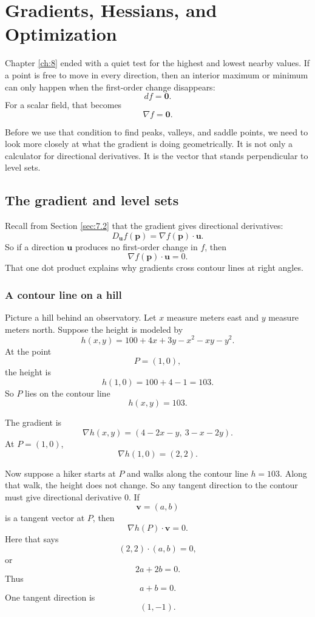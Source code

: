 
\chapter{Gradients, Hessians, and Optimization}
\label{ch:9}

Chapter \ref{ch:8} ended with a quiet test for the highest and lowest nearby values.
If a point is free to move in every direction, then an interior maximum or minimum can
only happen when the first-order change disappears:
\[
    df=\mathbf 0.
\]
For a scalar field, that becomes
\[
    \nabla f=\mathbf 0.
\]

Before we use that condition to find peaks, valleys, and saddle points, we need to look
more closely at what the gradient is doing geometrically.  It is not only a calculator for
directional derivatives.  It is the vector that stands perpendicular to level sets.

\section{The gradient and level sets}
\label{sec:9.1}

Recall from Section \ref{sec:7.2} that the gradient gives directional derivatives:
\[
    D_{\mathbf u}f(\mathbf p)=\nabla f(\mathbf p)\cdot \mathbf u.
\]
So if a direction \(\mathbf u\) produces no first-order change in \(f\), then
\[
    \nabla f(\mathbf p)\cdot \mathbf u=0.
\]
That one dot product explains why gradients cross contour lines at right angles.

\subsection{A contour line on a hill}

Picture a hill behind an observatory.  Let \(x\) measure meters east and \(y\) measure
meters north.  Suppose the height is modeled by
\[
    h(x,y)=100+4x+3y-x^2-xy-y^2.
\]
At the point
\[
    P=(1,0),
\]
the height is
\[
    h(1,0)=100+4-1=103.
\]
So \(P\) lies on the contour line
\[
    h(x,y)=103.
\]

The gradient is
\[
    \nabla h(x,y)=\left(4-2x-y,\ 3-x-2y\right).
\]
At \(P=(1,0)\),
\[
    \nabla h(1,0)=(2,2).
\]

Now suppose a hiker starts at \(P\) and walks along the contour line \(h=103\).
Along that walk, the height does not change.  So any tangent direction to the contour
must give directional derivative \(0\).  If
\[
    \mathbf v=(a,b)
\]
is a tangent vector at \(P\), then
\[
    \nabla h(P)\cdot \mathbf v=0.
\]
Here that says
\[
    (2,2)\cdot(a,b)=0,
\]
or
\[
    2a+2b=0.
\]
Thus
\[
    a+b=0.
\]
One tangent direction is
\[
    (1,-1).
\]

